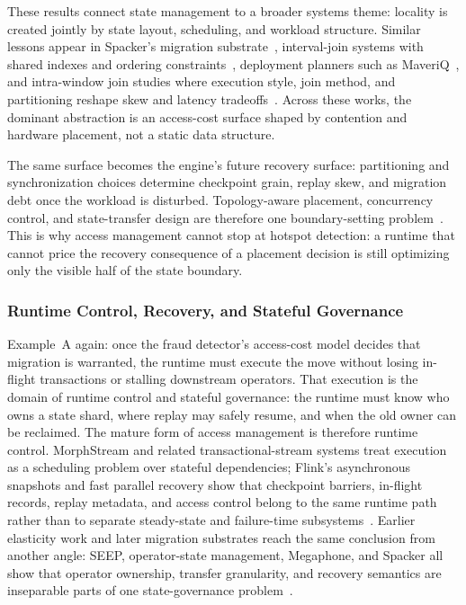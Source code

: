 ﻿\documentclass[manuscript]{acmart}
\begin{document}
These results connect state management to a broader systems theme: locality is created jointly by state layout, scheduling, and workload structure. Similar lessons appear in Spacker's migration substrate~\cite{mao2025spacker}, interval-join systems with shared indexes and ordering constraints~\cite{zhang2023openmldb}, deployment planners such as MaveriQ~\cite{liakopoulos2025maveriq}, and intra-window join studies where execution style, join method, and partitioning reshape skew and latency tradeoffs~\cite{zhang2021intrawindowjoin}. Across these works, the dominant abstraction is an access-cost surface shaped by contention and hardware placement, not a static data structure.

The same surface becomes the engine's future recovery surface: partitioning and synchronization choices determine checkpoint grain, replay skew, and migration debt once the workload is disturbed. Topology-aware placement, concurrency control, and state-transfer design are therefore one boundary-setting problem~\cite{zhang2019briskstream,zhang2020concurrent,carbone2015asynchronous,zhao2024recovery,mao2025spacker}. This is why access management cannot stop at hotspot detection: a runtime that cannot price the recovery consequence of a placement decision is still optimizing only the visible half of the state boundary.

\subsubsection{Runtime Control, Recovery, and Stateful Governance}

Example~A again: once the fraud detector's access-cost model decides that migration is warranted, the runtime must execute the move without losing in-flight transactions or stalling downstream operators. That execution is the domain of runtime control and stateful governance: the runtime must know who owns a state shard, where replay may safely resume, and when the old owner can be reclaimed. The mature form of access management is therefore runtime control. MorphStream and related transactional-stream systems treat execution as a scheduling problem over stateful dependencies; Flink's asynchronous snapshots and fast parallel recovery show that checkpoint barriers, in-flight records, replay metadata, and access control belong to the same runtime path rather than to separate steady-state and failure-time subsystems~\cite{mao2023morphstream,zhao2025morphstream,carbone2015asynchronous,zhao2024recovery}. Earlier elasticity work and later migration substrates reach the same conclusion from another angle: SEEP, operator-state management, Megaphone, and Spacker all show that operator ownership, transfer granularity, and recovery semantics are inseparable parts of one state-governance problem~\cite{fernandez2010seep,fernandez2013osm,nasir2019megaphone,mao2025spacker}.
\end{document}
